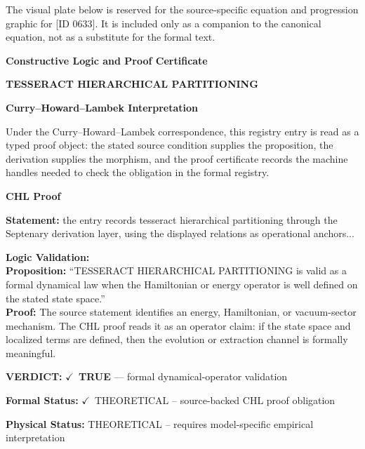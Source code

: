 \begingroup\footnotesize\sloppy
The visual plate below is reserved for the source-specific equation and progression graphic for [ID 0633]. It is included only as a companion to the canonical equation, not as a substitute for the formal text.
\par\endgroup
\ifTZPDarkEdition
{}
\fi

\clearpage
\begingroup\tzpsupportsetup
\noindent\textbf{\fontsize{10.8pt}{12.8pt}\selectfont [ID 0633] Constructive Logic and Proof Certificate}\par
\noindent\textbf{\fontsize{10pt}{12pt}\selectfont TESSERACT HIERARCHICAL PARTITIONING}\par
\vspace{0.45em}
\begingroup
\footnotesize
\setlength{\parskip}{0.22em}
\setlength{\parindent}{0pt}
\noindent\textbf{Curry--Howard--Lambek Interpretation}\par
Under the Curry--Howard--Lambek correspondence, this registry entry is read as a typed proof
object: the stated source condition supplies the proposition, the derivation supplies the
morphism, and the proof certificate records the machine handles needed to check the obligation
in the formal registry.

\vspace{0.45em}
\noindent\textbf{CHL Proof}\par
\textbf{Statement:} the entry records tesseract hierarchical partitioning through the Septenary derivation
layer, using the displayed relations as operational anchors...

\textbf{Logic Validation:}\\
\textbf{Proposition:} ``TESSERACT HIERARCHICAL PARTITIONING is valid as a formal dynamical law when the
Hamiltonian or energy operator is well defined on the stated state space.''\\
\textbf{Proof:} The source statement identifies an energy, Hamiltonian, or vacuum-sector mechanism. The
CHL proof reads it as an operator claim: if the state space and localized terms are
defined, then the evolution or extraction channel is formally meaningful.

\textbf{VERDICT:} \ensuremath{\checkmark}\ \textbf{TRUE} --- formal dynamical-operator validation

\textbf{Formal Status:} \ensuremath{\checkmark}\ THEORETICAL -- source-backed CHL proof obligation

\textbf{Physical Status:} THEORETICAL -- requires model-specific empirical interpretation
\par\vspace{0.45em}
\par
\ifTZPDarkEdition
{}
\fi
\endgroup
\endgroup
